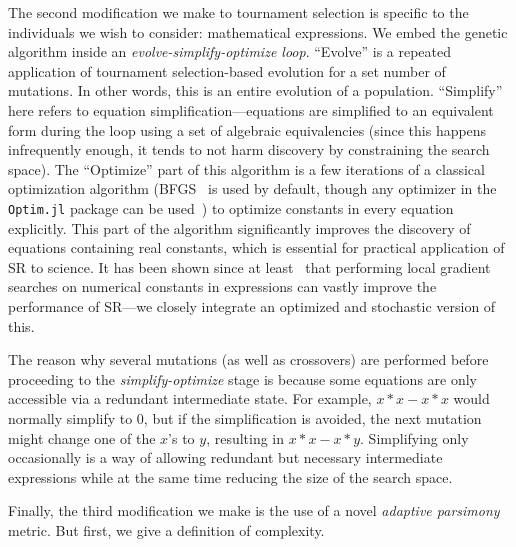 \documentclass[letterpaper,twocolumn]{scrartcl}
\begin{document}
The second modification we make to tournament selection is specific to the individuals we wish to consider: mathematical expressions.
We embed the genetic algorithm inside an \textit{evolve-simplify-optimize loop}.
``Evolve'' is a repeated application of tournament selection-based evolution for a set number of mutations.
In other words, this is an entire evolution of a population.
``Simplify'' here refers to equation simplification---equations are simplified to an equivalent form during the loop using a set of algebraic equivalencies (since this happens infrequently enough, it tends to not harm discovery by constraining the search space).
The ``Optimize'' part of this algorithm is a few iterations of a classical optimization algorithm (BFGS~\cite{broydenConvergenceClassDoublerank1970} is used by default, though any optimizer in the \texttt{Optim.jl} package can be used~\cite{mogensenOptimMathematicalOptimization2018}) to optimize constants in every equation explicitly.
This part of the algorithm significantly improves the discovery of equations containing real constants, which is essential for practical application of SR to science.
It has been shown since at least~\cite{topchyFasterGeneticProgramming2001} that performing local gradient searches on numerical constants in expressions can vastly improve the performance of SR---we closely integrate an optimized and stochastic version of this.

The reason why several mutations (as well as crossovers) are performed before proceeding to the \textit{simplify-optimize} stage is because some equations are only accessible via a redundant intermediate state.
For example, $x\ast x - x\ast x$ would normally simplify to $0$, but if the simplification is avoided, the next mutation might change one of the $x$'s to $y$, resulting in $x\ast x - x \ast y$.
Simplifying only occasionally is a way of allowing redundant but necessary intermediate expressions while at the same time reducing the size of the search space.

Finally, the third modification we make is the use of a novel \textit{adaptive parsimony} metric.
But first, we give a definition of complexity.
\end{document}
